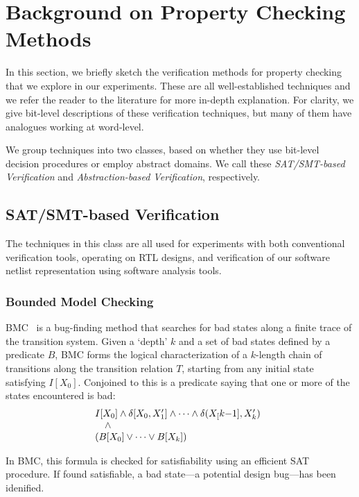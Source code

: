 \section{Background on Property Checking Methods}\label{sec:techniques}
%
In this section, we briefly sketch the verification methods for property checking that
we explore in our experiments. These are all well-established techniques and we refer 
the reader to the literature for more in-depth explanation.
For clarity, we give bit-level descriptions of these verification techniques, but
 many of them have analogues working at word-level.

We group techniques into two classes, based on whether 
they use bit-level decision procedures or employ abstract domains. We call these 
\textit{SAT/SMT-based Verification} and \textit{Abstraction-based Verification}, 
respectively.

\subsection{SAT/SMT-based Verification}\label{netlist-verif}
%
The techniques in this class are all used for experiments with both conventional verification tools,
operating on RTL designs, and verification of  our software netlist representation using software analysis tools.

\subsubsection{Bounded Model Checking} 
%
BMC~\cite{biere} is a bug-finding method that searches for bad states along a finite trace of 
the transition system. Given a `depth' $k$ and a set of bad states defined by a predicate
$B$, BMC forms the logical characterization of a $k$-length chain of transitions along the 
transition relation $T$,  starting from any initial state satisfying $I[X_0]$. 
Conjoined to this is a predicate saying that one or more of the states encountered 
is bad:
%
\[ \begin{array}[t]{@{}l}
   I[X_0] \wedge \delta[X_0, X'_1] \wedge \dots \wedge \delta(X_[k{-}1], X'_k)\\
   \quad \wedge \\
   (B[X_0] \vee \dots \vee B[X_k]) 
   \end{array}
\]

\noindent In BMC, this formula is checked for satisfiability using an efficient SAT procedure.
If found satisfiable, a bad state---a potential design bug---has been idenified.

